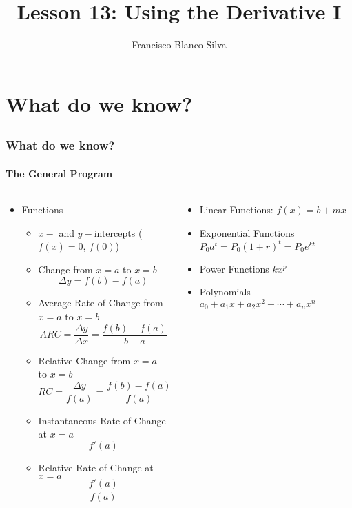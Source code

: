 \documentclass[9pt,xcolor=x11names,compress]{beamer}
\title{Lesson 13: Using the Derivative I}
\author[Francisco Blanco-Silva]{Francisco Blanco-Silva}
\institute[USC]{University of South Carolina}
\date{
\pgfdeclarelindenmayersystem{testrhombus}{
	\rule{F -> F+FF++FF+F+++F++F+++F}
}
\begin{tikzpicture}[color=DeepSkyBlue4]
    \draw [l-system={testrhombus, axiom=F+FF++FF+F+++F++F+++F, order=3, step=1.5pt, angle=90}]
    lindenmayer system; 
	\end{tikzpicture}	
}
\begin{document}
\frame{\titlepage}

\section{What do we know?}
\subsection{}

\begin{frame}
\frametitle{What do we know?}
\framesubtitle{The General Program}
\begin{columns}[T]
\begin{column}{0.6\linewidth}
\begin{itemize}
\item Functions
\begin{itemize}
\item $x-$ and $y-$\alert{intercepts} ($f(x)=0$, $f(0)$)
\item \alert{Change} from $x=a$ to $x=b$ 
\begin{equation*}
	\Delta y = f(b)-f(a)
\end{equation*}
\item \alert{Average Rate of Change} from $x=a$ to $x=b$
\begin{equation*}
ARC=\frac{\Delta y}{\Delta x}=\frac{f(b)-f(a)}{b-a} 
\end{equation*}
\item \alert{Relative Change} from $x=a$ to $x=b$
\begin{equation*}
RC=\frac{\Delta y}{f(a)}=\frac{f(b)-f(a)}{f(a)}
\end{equation*}
\item \alert{Instantaneous Rate of Change} at $x=a$
\begin{equation*}
	f'(a)
\end{equation*}
\item \alert{Relative Rate of Change} at $x=a$
\begin{equation*}
	\frac{f'(a)}{f(a)}
\end{equation*}
\end{itemize}
\end{itemize}
\end{column}
\begin{column}{0.4\linewidth}
\begin{itemize}
	\item Linear Functions: $f(x)=b+mx$
	\item Exponential Functions $P_0 a^t = P_0 (1+r)^t = P_0 e^{kt}$
	\item Power Functions \newline \makebox[1cm]{} $kx^p$
	\item Polynomials $a_0+a_1x+a_2x^2+\dotsb+a_n x^n$
\end{itemize}
\end{column}
\end{columns}
\end{frame}
\end{document}
